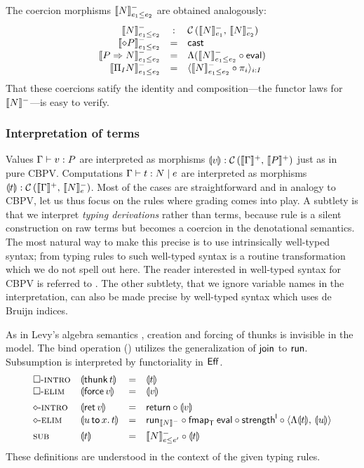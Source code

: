 \documentclass[acmsmall,review,anonymous]{acmart}\settopmatter{printfolios=true,printccs=false,printacmref=false}
\newcommand{\graybox}[1]{\grayboxtext{$#1$}}
\begin{document}
The coercion morphisms $\Denn N {e_1 \leq e_2}$ are obtained
analogously:
\[
\begin{array}{rcl}
  \Denn N {e_1 \leq e_2} & : & \Hom {\Denn N {e_1}} {\Denn N {e_2}} \\
  \Denn {\diamond P} {e_1 \leq e_2} & = & \tcast \\
  \Denn {P \To N}   {e_1 \leq e_2} & = &
    \Lambda(\Denn N {e_1 \leq e_2} \comp \teval) \\
  \Denn {\rect I N} {e_1 \leq e_2} & = &
    \langle \Denn N {e_1 \leq e_2} \comp \pi_i {} \rangle_{i:I} \\
\end{array}
\]
That these coercions satify the identity and composition---the functor
laws for $\denn N$---is easy to verify.

\subsubsection{Interpretation of terms}

Values $\ValTy \Gamma v P$ are interpreted as morphisms $\dent v :
\Hom {\denp \Gamma} {\denp P}$ just as in pure CBPV.  Computations
$\CompTy \Gamma t e N$ are interpreted as morphisms $\dent t : \Hom
{\denp \Gamma} {\Denn N e}$.  Most of the cases are straightforward
and in analogy to CBPV, let us thus focus on the
\graybox{\mbox{modified}} rules where grading comes into play.  A
subtlety is that we interpret \emph{typing derivations} rather than terms,
because rule \rsub is a silent construction on raw terms but becomes a
coercion in the denotational semantics.  The most natural way to make
this precise is to use intrinsically well-typed syntax; from typing
rules to such well-typed syntax is a routine transformation which we
do not spell out here.  The reader interested in well-typed syntax for
CBPV is referred to \citet{abelSattler:ppdp19}.
The other subtlety, that we ignore variable names in the
interpretation, can also be made precise by well-typed syntax which
uses de Bruijn indices.

As in Levy's algebra semantics \citeyearpar{levy:hosc06}, creation and
forcing of thunks is invisible in the model.  The bind operation
(\relim\diamond) utilizes the generalization of $\tjoin$ to $\trun$.
Subsumption is interpreted by functoriality in $\Eff$.
\[
\begin{array}{llcl}
\rintro\Box & \dent{\thunk t} & = & \dent t \\
\relim\Box  & \dent{\force v} & = & \dent v
\\[1ex]
\rintro\diamond & \dent{\ret v} & = & \treturn \comp \dent v \\
\relim\diamond  & \dent{\bind x u t} & = &
  \run[\denn N] \comp \fmap[\T]\teval \comp \strengthl \comp
  \langle \Lambda\dent t,\,\dent u \rangle
\\[1ex]
\rsub & \dent t & = & \Denn N {e \leq e'} \comp \dent t
\\
\end{array}
\]
These definitions are understood in the context of the given typing rules.
\end{document}

